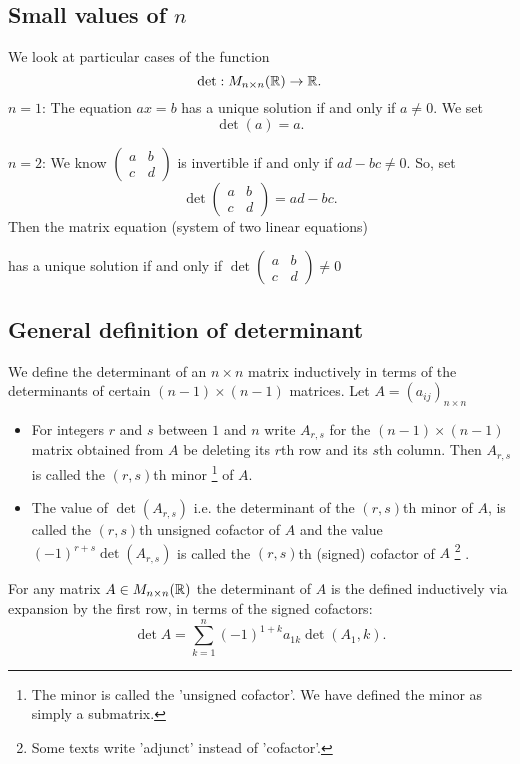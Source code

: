 \documentclass[10pt, a4paper]{article}
\begin{document}
\subsection{Small values of \texorpdfstring{$n$}{}}
We look at particular cases of the function
\[
\det : M_{n\times n}(\mathbb{R}) \rightarrow \mathbb{R}.
\]
$n = 1$:
The equation $ax = b$ has a unique solution if and only if $a \neq 0$.
We set
\[
\det(a) = a.
\]

$n = 2$:
We know $\begin{pmatrix}
    a & b \\ c & d
\end{pmatrix}$
is invertible if and only if $ad - bc \neq 0$.
So, set
\[
\det\begin{pmatrix}
    a & b \\ c & d
\end{pmatrix} = ad - bc.
\]
Then the matrix equation (system of two linear equations)

has a unique solution if and only if $\det\begin{pmatrix}
    a & b \\ c & d
\end{pmatrix} \neq 0$

\subsection{General definition of determinant}
We define the determinant of an $n \times n$ matrix inductively in terms of the determinants of certain $(n - 1)\times (n - 1)$ matrices.
Let $A = (a_{ij})_{n \times n}$
\begin{itemize}
    \item For integers $r$ and $s$ between $1$ and $n$ write $A_{r, s}$ for the $(n - 1)\times (n - 1)$ matrix obtained from $A$ be deleting its $r$th row and its $s$th column.
    Then $A_{r, s}$ is called the $(r, s)$th minor
    \footnote{The minor is called the 'unsigned cofactor'.
    We have defined the minor as simply a submatrix.}
    of $A$.
    \item The value of $\det(A_{r, s})$ i.e. the determinant of the $(r, s)$th minor of $A$,
    is called the $(r, s)$th unsigned cofactor of $A$ and the value $(-1) ^ {r + s}\det(A_{r, s})$ is called the $(r, s)$th (signed) cofactor of $A$
    \footnote{Some texts write 'adjunct' instead of 'cofactor'.}
    .
\end{itemize}

For any matrix $A \in M_{n \times n}(\mathbb{R})$ the determinant of $A$ is the defined inductively via expansion by the first row,
in terms of the signed cofactors:
\[
\det A = \sum_{k = 1}^{n}(-1) ^ {1 + k}a_{1k}\det(A_1, k).
\]
\end{document}
